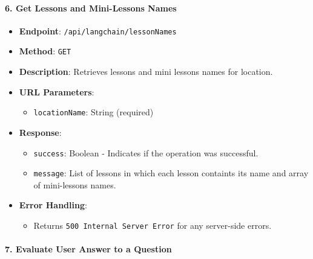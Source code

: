 \hypertarget{get-lessons-and-mini-lessons-names}{%
\paragraph{6. Get Lessons and Mini-Lessons
Names}\label{get-lessons-and-mini-lessons-names}}

\begin{itemize}
\tightlist
\item
  \textbf{Endpoint}: \texttt{/api/langchain/lessonNames}
\item
  \textbf{Method}: \texttt{GET}
\item
  \textbf{Description}: Retrieves lessons and mini lessons names for
  location.
\item
  \textbf{URL Parameters}:

  \begin{itemize}
  \tightlist
  \item
    \texttt{locationName}: String (required)
  \end{itemize}
\item
  \textbf{Response}:

  \begin{itemize}
  \tightlist
  \item
    \texttt{success}: Boolean - Indicates if the operation was
    successful.
  \item
    \texttt{message}: List of lessons in which each lesson containts its
    name and array of mini-lessons names.
  \end{itemize}
\item
  \textbf{Error Handling}:

  \begin{itemize}
  \tightlist
  \item
    Returns \texttt{500\ Internal\ Server\ Error} for any server-side
    errors.
  \end{itemize}
\end{itemize}

\hypertarget{evaluate-user-answer-to-a-question}{%
\paragraph{7. Evaluate User Answer to a
Question}\label{evaluate-user-answer-to-a-question}}

